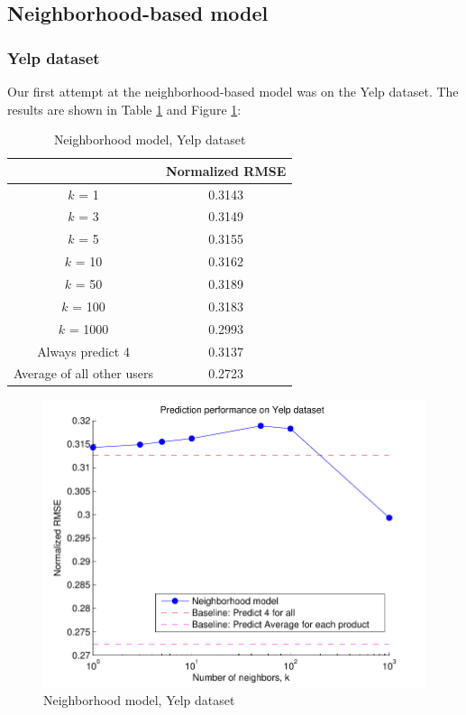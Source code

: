 \documentclass[letterpaper, 11 pt, conference]{ieeeconf}
\begin{document}
\subsection{Neighborhood-based model}

\subsubsection{Yelp dataset}
Our first attempt at the neighborhood-based model was on the Yelp dataset. The 
results are shown in Table \ref{table:modelone_yelp} and Figure 
\ref{fig:modelone_yelp}:

\begin{table}[htb]
\centering
\begin{tabular}{|c|c|}
\cline{2-2}

\multicolumn{1}{c|}{}  & {Normalized RMSE} \tabularnewline \hline
$k$ = 1 & 0.3143  \tabularnewline
$k$ = 3 &  0.3149 \tabularnewline
$k$ = 5 & 0.3155  \tabularnewline
$k$ = 10 & 0.3162  \tabularnewline
$k$ = 50  & 0.3189 \tabularnewline
$k$ = 100 & 0.3183 \tabularnewline
$k$ = 1000 & 0.2993 \tabularnewline
\hline
Always predict 4 & 0.3137 \tabularnewline 
Average of all other users & 0.2723 \tabularnewline

\hline
\end{tabular}
\caption{Neighborhood model, Yelp dataset}
\label{table:modelone_yelp}
\end{table}

\begin{figure}[h]
\includegraphics[scale=0.6]{images/modelone_yelp.pdf}
\caption{Neighborhood model, Yelp dataset}
\label{fig:modelone_yelp}
\end{figure}
\end{document}
